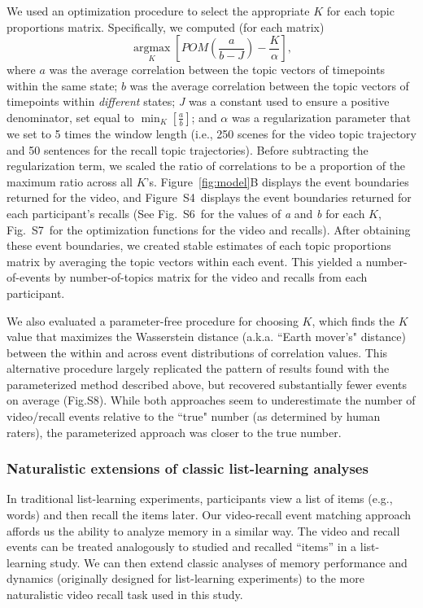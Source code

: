 \documentclass{article}
\newcommand{\argmax}{\mathop{\mathrm{argmax}}\limits}
\newcommand{\corrmats}{S4}
\newcommand{\kcorrs}{S6}
\newcommand{\kopt}{S7}
\newcommand{\wasserstein}{S8}
\begin{document}
We used an optimization procedure to select the appropriate $K$ for each topic proportions matrix.  Specifically, we computed (for each matrix)
\[
  \argmax_K \left[POM(\frac{a}{b-J}) - \frac{K}{\alpha}\right],
\]
where $a$ was the average correlation between the topic vectors of timepoints within the same state; $b$ was the average correlation between the topic vectors of timepoints within \textit{different} states; \textit{J} was a constant used to ensure a positive denominator, set equal to $\min_K\left[{\frac{a}{b}}\right]$; and $\alpha$ was a regularization parameter that we set to 5 times the window length (i.e., 250 scenes for the video topic trajectory and 50 sentences for the recall topic trajectories).  Before subtracting the regularization term, we scaled the ratio of correlations to be a proportion of the maximum ratio across all $K$'s.  Figure~\ref{fig:model}B displays the event boundaries returned for the video, and Figure~\corrmats~displays the event boundaries returned for each participant's recalls (See Fig.~\kcorrs~for the values of \textit{a} and \textit{b} for each $K$, Fig.~\kopt~for the optimization functions for the video and recalls).  After obtaining these event boundaries, we created stable estimates of each topic proportions matrix by averaging the topic vectors within each event.  This yielded a number-of-events by number-of-topics matrix for the video and recalls from each participant.

We also evaluated a parameter-free procedure for choosing $K$, which finds the $K$ value that maximizes the Wasserstein distance (a.k.a. ``Earth mover's" distance) between the within and across event distributions of correlation values. This alternative procedure largely replicated the pattern of results found with the parameterized method described above, but recovered substantially fewer events on average (Fig.\wasserstein). While both approaches seem to underestimate the number of video/recall events relative to the ``true" number (as determined by human raters), the parameterized approach was closer to the true number.

\subsubsection*{Naturalistic extensions of classic list-learning analyses}
In traditional list-learning experiments, participants view a list of items (e.g., words) and then recall the items later.  Our video-recall event matching approach affords us the ability to analyze memory in a similar way. The video and recall events can be treated analogously to studied and recalled ``items'' in a list-learning study.  We can then extend classic analyses of memory performance and dynamics (originally designed for list-learning experiments) to the more naturalistic video recall task used in this study.
\end{document}
